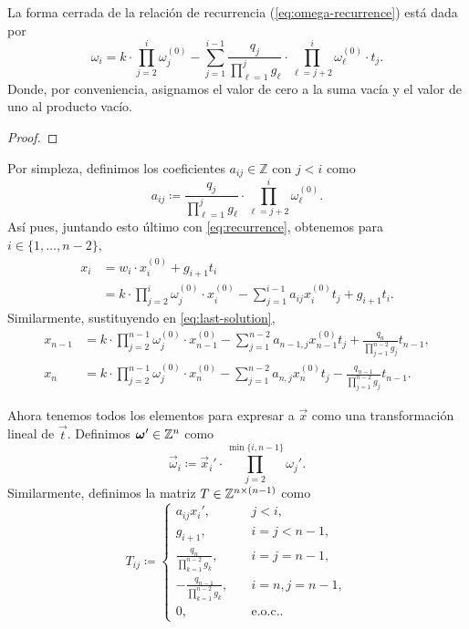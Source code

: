 \begin{lemma}
	La forma cerrada de la relación de recurrencia (\ref{eq:omega-recurrence}) está dada por
	\begin{equation}
		\label{eq:omega-formula}
		\omega_i = k \cdot \prod_{j=2}^{i} \omega_j^{(0)} -
				 \sum_{j=1}^{i - 1}\frac{q_j}{\prod_{\ell=1}^{j}g_\ell} \cdot
				 \prod_{\ell=j+2}^{i}\omega_\ell^{(0)} \cdot t_j.
	\end{equation}
	Donde, por conveniencia, asignamos el valor de cero a la suma vacía y el valor de uno al
	producto vacío.
\end{lemma}
\begin{proof}
\end{proof}

Por simpleza, definimos los coeficientes $a_{ij} \in \mathbb{Z}$ con $j < i$ como
\begin{equation}
	\label{phase-2:eq:coeffs}
	a_{ij} \coloneq \frac{q_j}{\prod_{\ell = 1}^{j}g_\ell} \cdot \prod_{\ell = j +
	2}^{i}\omega_\ell^{(0)}.
\end{equation}
Así pues, juntando esto último con \ref{eq:recurrence}, obtenemos para $i \in \{1, \ldots, n -
2\}$, 
\begin{align}
	x_i &= w_i \cdot x_i^{(0)} + g_{i + 1}t_i \nonumber \\
		&= k \cdot \prod_{j=2}^{i}\omega_j^{(0)} \cdot x_i^{(0)} - \sum_{j=1}^{i - 1}a_{ij}x_i^{(0)}
		t_j + g_{i + 1}t_i \label{eq:x:i}.
\end{align}
Similarmente, sustituyendo en \ref{eq:last-solution},
\begin{align}
	x_{n-1} &= k \cdot \prod_{j=2}^{n-1} \omega_j^{(0)} \cdot x_{n-1}^{(0)} - \sum_{j=1}^{n-2}
	a_{n-1,j}x_{n-1}^{(0)} t_j + \frac{q_n}{\prod_{j=1}^{n-2}g_j} t_{n-1}, \label{eq:x:-1}\\
	x_{n} &= k \cdot \prod_{j=2}^{n-1} \omega_j^{(0)} \cdot x_{n}^{(0)} - \sum_{j=1}^{n-2}a_{n,j}x_n^{(0)}t_j -
	\frac{q_{n-1}}{\prod_{j=1}^{n-2} g_j}t_{n-1} \label{eq:x:last}.
\end{align}

Ahora tenemos todos los elementos para expresar a $\vec{x}$ como una transformación lineal de
$\vec{t}$. Definimos $\boldsymbol{\omega}' \in \mathbb{Z}^n$ como
\begin{equation}
	\label{eq:vec-omega}
	\vec{\omega}_i \coloneq \vec{x}_i' \cdot \prod_{j = 2}^{\min{\lbrace i, n - 1 \rbrace}}\omega_j'.
\end{equation}
Similarmente, definimos la matriz $T \in \mathbb{Z}^{n \times (n - 1)}$ como
\begin{equation}
	\label{eq:mat-T}
	T_{ij} \coloneq \begin{cases}
		a_{ij}x_i', &\quad j < i, \\
		g_{i + 1},  &\quad i = j < n - 1, \\
		\frac{q_n}{\prod_{k=1}^{n-2}g_k}, &\quad i = j = n - 1, \\
		-\frac{q_{n-1}}{\prod_{k=1}^{n-2}g_k}, &\quad i = n, j = n - 1, \\
		0, &\quad \text{e.o.c.}.
	\end{cases}
\end{equation}

